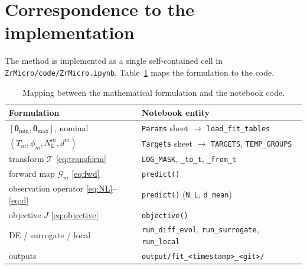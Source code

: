\documentclass[11pt]{article}
\newcommand{\param}{\bm{\theta}}
\newcommand{\NL}{N_{\mathrm{L}}}
\newcommand{\dpa}{\phi}
\begin{document}
\section{Correspondence to the implementation}
The method is implemented as a single self-contained cell in
\texttt{ZrMicro/code/ZrMicro.ipynb}. Table~\ref{tab:map} maps the formulation to
the code.
\begin{table}[ht]
\centering
\small
\begin{tabular}{@{}ll@{}}
\toprule
Formulation & Notebook entity \\
\midrule
$[\param_{\min},\param_{\max}]$, nominal & \texttt{Params} sheet $\to$ \texttt{load\_fit\_tables} \\
$(T_m,\dpa_m,\NL^m,d^m)$ & \texttt{Targets} sheet $\to$ \texttt{TARGETS}, \texttt{TEMP\_GROUPS} \\
transform $\mathcal{T}$ \eqref{eq:transform} & \texttt{LOG\_MASK}, \texttt{\_to\_t}, \texttt{\_from\_t} \\
forward map $\mathcal{G}_m$ \eqref{eq:fwd} & \texttt{predict()} \\
observation operator \eqref{eq:NL}--\eqref{eq:d} & \texttt{predict()} (\texttt{N\_L}, \texttt{d\_mean}) \\
objective $J$ \eqref{eq:objective} & \texttt{objective()} \\
DE / surrogate / local & \texttt{run\_diff\_evol}, \texttt{run\_surrogate}, \texttt{run\_local} \\
outputs & \texttt{output/fit\_<timestamp>\_<git>/} \\
\bottomrule
\end{tabular}
\caption{Mapping between the mathematical formulation and the notebook code.}
\label{tab:map}
\end{table}
\end{document}
